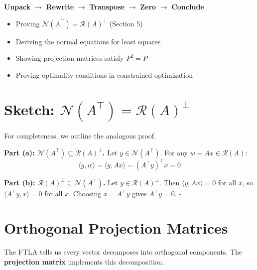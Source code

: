 \documentclass[10pt, twocolumn]{article}
\theoremstyle{definition}
\theoremstyle{plain}
\newcommand{\NN}{\mathcal{N}}
\newcommand{\Range}{\mathcal{R}}
\begin{document}
\begin{tcolorbox}[colframe=black!50, title={\small One-Line Summary}]
\textbf{Unpack} $\to$ \textbf{Rewrite} $\to$ \textbf{Transpose} $\to$ \textbf{Zero} $\to$ \textbf{Conclude}
\end{tcolorbox}

\begin{tcolorbox}[colframe=black!50, title={\small Where This Method Applies}]
\begin{itemize}
    \item Proving $\NN(A^\top) = \Range(A)^\perp$ (Section 5)
    \item Deriving the normal equations for least squares
    \item Showing projection matrices satisfy $P^2 = P$
    \item Proving optimality conditions in constrained optimization
\end{itemize}
\end{tcolorbox}

\section{Sketch: $\NN(A^\top) = \Range(A)^\perp$}

For completeness, we outline the analogous proof.

\textbf{Part (a): $\NN(A^\top) \subseteq \Range(A)^\perp$.} Let $y \in \NN(A^\top)$. For any $w = Ax \in \Range(A)$:
\[
\langle y, w \rangle = \langle y, Ax \rangle = (A^\top y)^\top x = 0
\]

\textbf{Part (b): $\Range(A)^\perp \subseteq \NN(A^\top)$.} Let $y \in \Range(A)^\perp$. Then $\langle y, Ax \rangle = 0$ for all $x$, so $\langle A^\top y, x \rangle = 0$ for all $x$. Choosing $x = A^\top y$ gives $A^\top y = 0$. $\square$

\section{Orthogonal Projection Matrices}

The FTLA tells us every vector decomposes into orthogonal components. The \textbf{projection matrix} implements this decomposition.
\end{document}
